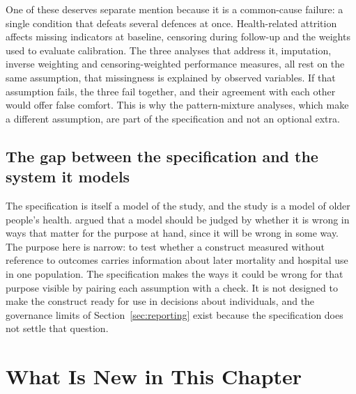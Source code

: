 One of these deserves separate mention because it is a common-cause failure: a single condition that defeats several defences at once. Health-related attrition affects missing indicators at baseline, censoring during follow-up and the weights used to evaluate calibration. The three analyses that address it, imputation, inverse weighting and censoring-weighted performance measures, all rest on the same assumption, that missingness is explained by observed variables. If that assumption fails, the three fail together, and their agreement with each other would offer false comfort. This is why the pattern-mixture analyses, which make a different assumption, are part of the specification and not an optional extra.

\subsection{The gap between the specification and the system it models}

The specification is itself a model of the study, and the study is a model of older people's health. \citet{box_1976} argued that a model should be judged by whether it is wrong in ways that matter for the purpose at hand, since it will be wrong in some way. The purpose here is narrow: to test whether a construct measured without reference to outcomes carries information about later mortality and hospital use in one population. The specification makes the ways it could be wrong for that purpose visible by pairing each assumption with a check. It is not designed to make the construct ready for use in decisions about individuals, and the governance limits of Section~\ref{sec:reporting} exist because the specification does not settle that question.

\section*{What Is New in This Chapter}

